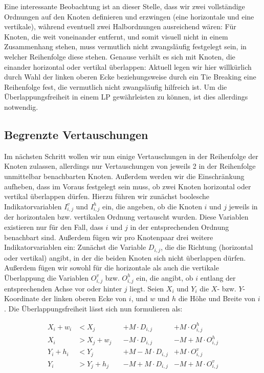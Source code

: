 Eine interessante Beobachtung ist an dieser Stelle, dass wir zwei vollständige Ordnungen auf den Knoten definieren und erzwingen (eine horizontale und eine vertikale), während eventuell zwei Halbordnungen ausreichend wären: Für Knoten, die weit voneinander entfernt, und somit visuell nicht in einem Zusammenhang stehen, muss vermutlich nicht zwangsläufig festgelegt sein, in welcher Reihenfolge diese stehen. Genause verhält es sich mit Knoten, die einander horizontal oder vertikal überlappen: Aktuell legen wir hier willkürlich durch Wahl der linken oberen Ecke beziehungsweise durch ein Tie Breaking eine Reihenfolge fest, die vermutlich nicht zwangsläufig hilfreich ist. Um die Überlappungsfreiheit in einem LP gewährleisten zu können, ist dies allerdings notwendig.

\subsection{Begrenzte Vertauschungen}
\label{sub:ilp:2}

Im nächsten Schritt wollen wir nun einige Vertauschungen in der Reihenfolge der Knoten zulassen, allerdings nur Vertauschungen von jeweils 2 in der Reihenfolge unmittelbar benachbarten Knoten. Außerdem werden wir die Einschränkung aufheben, dass im Voraus festgelegt sein muss, ob zwei Knoten horizontal oder vertikal überlappen dürfen. Hierzu führen wir zunächst boolesche Indikatorvariablen $I^{v}_{i,j}$ und $I^{h}_{i,j}$ ein, die angeben, ob die Knoten $i$ und $j$ jeweils in der horizontalen bzw. vertikalen Ordnung vertauscht wurden. Diese Variablen existieren nur für den Fall, dass $i$ und $j$ in der entsprechenden Ordnung benachbart sind. Außerdem fügen wir pro Knotenpaar drei weitere Indikatorvariablen ein: Zunächst die Variable $D_{i,j}$, die die Richtung (horizontal oder vertikal) angibt, in der die beiden Knoten sich nicht überlappen dürfen. Außerdem fügen wir sowohl für die horizontale als auch die vertikale Überlappung die Variablen $O^{v}_{i,j}$ bzw. $O^{h}_{i,j}$ ein, die angibt, ob $i$ entlang der entsprechenden Achse vor oder hinter $j$ liegt. Seien $X_i$ und $Y_i$ die $X$- bzw. $Y$-Koordinate der linken oberen Ecke von $i$, und $w$ und $h$ die Höhe und Breite von $i$. Die Überlappungsfreiheit lässt sich nun formulieren als:

\begin{align}
	X_i + w_i &< X_j &&+ M \cdot D_{i,j} &+ M \cdot O^{h}_{i,j} \label{eqn:overlap:h1}\\
	X_i &> X_j + w_j &&- M \cdot D_{i,j} &- M + M \cdot O^{h}_{i,j} \label{eqn:overlap:h2}\\
	Y_i + h_i &< Y_j &&+ M - M \cdot D_{i,j} &+ M \cdot O^{v}_{i,j} \label{eqn:overlap:v1}\\
	Y_i &> Y_j + h_j &&- M + M \cdot D_{i,j} &- M + M \cdot O^{v}_{i,j} \label{eqn:overlap:v2}
\end{align}

